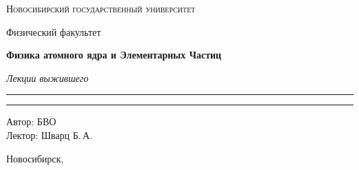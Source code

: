 \documentclass[12pt,a4paper]{report}
\begin{document}
\begin{titlepage}
    \thispagestyle{empty}

    \begin{center}
        \vspace*{1.5cm}

        {\Large\scshape Новосибирский государственный университет\par}
        \vspace{0.25cm}
        {\large Физический факультет\par}

        \vfill

        {\Huge\bfseries Физика атомного ядра и Элементарных Частиц\par}

        \vspace{0.45cm}

        {\Large\itshape Лекции выжившего\par}

        \vspace{0.8cm}

        \rule{0.72\linewidth}{0 pt}



        \rule{2\linewidth}{0pt}

        \vfill

        \begin{flushright}
            \large
            Автор: БВО\\[0.25cm]
            Лектор: Шварц Б.\,А.
        \end{flushright}

        \vspace{1.2cm}

        {\large Новосибирск, \the\year}

    \end{center}
\end{titlepage}

\tableofcontents
\newpage



\clearpage
\end{document}
